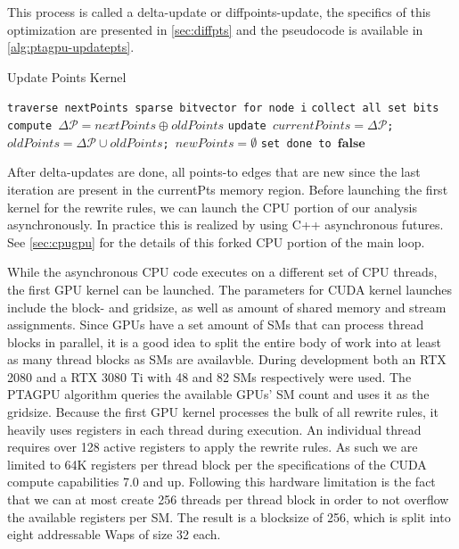 This process is called a delta-update or diffpoints-update, the specifics of this optimization are presented in \autoref{sec:diffpts} and the pseudocode is available in \autoref{alg:ptagpu-updatepts}.
\begin{algorithm}
    \caption{Update Points Kernel}\label{alg:ptagpu-updatepts}
    \begin{algorithmic}
        \State \texttt{traverse nextPoints sparse bitvector for node i}
        \State \texttt{collect all set bits}
        \State \texttt{compute $\Delta \mathcal{P} = nextPoints\oplus oldPoints$} 
        \State \texttt{update $currentPoints = \Delta \mathcal{P}$; $oldPoints = \Delta \mathcal{P} \cup oldPoints$; $newPoints = \emptyset$}
        \State \texttt{set done to $\mathbf{false}$}
        \EndIf
        \EndFor
    \end{algorithmic}
\end{algorithm}
After delta-updates are done, all points-to edges that are new since the last iteration are present in the currentPts memory region.
Before launching the first kernel for the rewrite rules, we can launch the CPU portion of our analysis asynchronously.
In practice this is realized by using C++ asynchronous futures.
See \autoref{sec:cpugpu} for the details of this forked CPU portion of the main loop.

While the asynchronous CPU code executes on a different set of CPU threads, the first GPU kernel can be launched.
The parameters for CUDA kernel launches include the block- and gridsize, as well as amount of shared memory and stream assignments.
Since GPUs have a set amount of SMs that can process thread blocks in parallel, it is a good idea to split the entire body of work into at least as many thread blocks as SMs are availavble.
During development both an RTX 2080 and a RTX 3080 Ti with 48 and 82 SMs respectively were used. The PTAGPU algorithm queries the available GPUs' SM count and uses it as the gridsize.
Because the first GPU kernel processes the bulk of all rewrite rules, it heavily uses registers in each thread during execution. An individual thread requires over 128 active registers to apply the rewrite rules. As such we are limited to 64K registers per thread block per the specifications of the CUDA compute capabilities 7.0 and up. Following this hardware limitation is the fact that we can at most create 256 threads per thread block in order to not overflow the available registers per SM.
The result is a blocksize of 256, which is split into eight addressable Waps of size 32 each.

